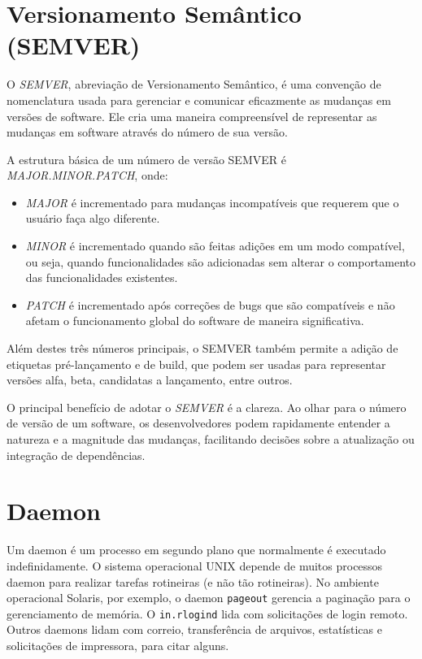 \documentclass[12pt, %
openright, 
oneside, %
a4paper,    %
brazil]{facom-ufu-abntex2}
\begin{document}
\section{Versionamento Semântico (SEMVER)}

O \textit{SEMVER}, abreviação de Versionamento Semântico, é uma convenção de
nomenclatura usada para gerenciar e comunicar eficazmente as mudanças em
versões de software. Ele cria uma maneira compreensível de representar as
mudanças em software através do número de sua versão.

A estrutura básica de um número de versão SEMVER é \textit{MAJOR.MINOR.PATCH},
onde:

\begin{itemize}
	\item \textit{MAJOR} é incrementado para mudanças incompatíveis que requerem que o usuário faça algo diferente.
	\item \textit{MINOR} é incrementado quando são feitas adições em um modo compatível, ou seja, quando funcionalidades são adicionadas sem alterar o comportamento das funcionalidades existentes.
	\item \textit{PATCH} é incrementado após correções de bugs que são compatíveis e não afetam o funcionamento global do software de maneira significativa.
\end{itemize}

Além destes três números principais, o SEMVER também permite a adição de
etiquetas pré-lançamento e de build, que podem ser usadas para representar
versões alfa, beta, candidatas a lançamento, entre outros.

O principal benefício de adotar o \textit{SEMVER} é a clareza. Ao olhar para o
número de versão de um software, os desenvolvedores podem rapidamente entender
a natureza e a magnitude das mudanças, facilitando decisões sobre a atualização
ou integração de dependências. \cite{semver}

\section{Daemon}

Um daemon é um processo em segundo plano que normalmente é executado
indefinidamente. O sistema operacional UNIX depende de muitos processos daemon
para realizar tarefas rotineiras (e não tão rotineiras). No ambiente
operacional Solaris, por exemplo, o daemon \texttt{pageout} gerencia a
paginação para o gerenciamento de memória. O \texttt{in.rlogind} lida com
solicitações de login remoto. Outros daemons lidam com correio, transferência
de arquivos, estatísticas e solicitações de impressora, para citar alguns.
\cite{kay2004unix}
\end{document}
